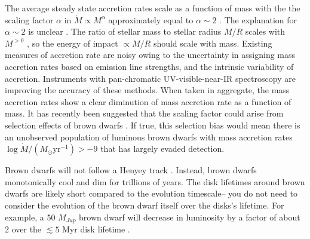 The average steady state accretion rates scale as a function of mass with the the scaling factor $\alpha$ in $\dot{M}\propto M^\alpha$ approximately equal to $\alpha \sim 2$ \citep{2008A&A...481..423G,2006ApJ...639L..83A,2006A&A...452..245N,2009ApJ...696.1589H}.  The explanation for $\alpha \sim 2$ is unclear \citep{2006ApJ...648..484H}.  The ratio of stellar mass to stellar radius $M/R$ scales with $M^{>0}$ \citep{2009AIPC.1094..102C}, so the energy of impact $\propto M/R$ should scale with mass.  Existing measures of accretion rate are noisy owing to the uncertainty in assigning mass accretion rates based on emission line strengths, and the intrinsic variability of accretion.  Instruments with pan-chromatic UV-visible-near-IR spectroscopy \citep{2011A&A...536A.105V,2012A&A...548A..56R} are improving the accuracy of these methods.  When taken in aggregate, the mass accretion rates show a clear diminution of mass accretion rate as a function of mass.  It has recently been suggested that the scaling factor could arise from selection effects of brown dwarfs \citep{2010MNRAS.409.1307M}.  If true, this selection bias would mean there is an unobserved population of luminous brown dwarfs with mass accretion rates $\log{\dot{M}/(M_{\odot}\mathrm{yr}^{-1})} >-9$ that has largely evaded detection.

Brown dwarfs will not follow a Henyey track \citep{1959ApJ...129....2H}.  Instead, brown dwarfs monotonically cool and dim for trillions of years.  The disk lifetimes around brown dwarfs are likely short compared to the evolution timescale-- you do not need to consider the evolution of the brown dwarf itself over the disks's lifetime.  For example, a 50 $M_{Jup}$ brown dwarf will decrease in luminosity by a factor of about 2 over the $\lesssim5$ Myr disk lifetime \citep{2002A&A...382..563B}.

